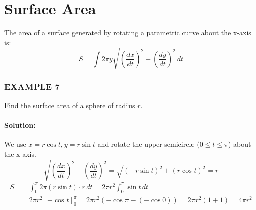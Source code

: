 \documentclass{article}
\begin{document}
\section*{Surface Area}
The area of a surface generated by rotating a parametric curve about the x-axis is:
\[
S = \int 2\pi y \sqrt{\left(\frac{dx}{dt}\right)^2 + \left(\frac{dy}{dt}\right)^2} \, dt
\]

\subsubsection*{EXAMPLE 7}
Find the surface area of a sphere of radius $r$.

\paragraph{Solution:}
We use $x = r\cos t, y = r\sin t$ and rotate the upper semicircle ($0 \le t \le \pi$) about the x-axis.
\[
\sqrt{\left(\frac{dx}{dt}\right)^2 + \left(\frac{dy}{dt}\right)^2} = \sqrt{(-r\sin t)^2 + (r\cos t)^2} = r
\]
\begin{align*}
    S &= \int_{0}^{\pi} 2\pi (r\sin t) \cdot r \, dt = 2\pi r^2 \int_{0}^{\pi} \sin t \, dt \\
    &= 2\pi r^2 [-\cos t]_{0}^{\pi} = 2\pi r^2 (-\cos\pi - (-\cos 0)) = 2\pi r^2(1+1) = 4\pi r^2
\end{align*}
\end{document}
